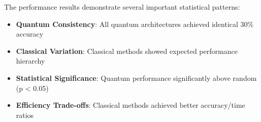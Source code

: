 \documentclass[11pt,a4paper]{article}
\begin{document}
The performance results demonstrate several important statistical patterns:

\begin{itemize}
    \item \textbf{Quantum Consistency}: All quantum architectures achieved identical 30\% accuracy
    \item \textbf{Classical Variation}: Classical methods showed expected performance hierarchy
    \item \textbf{Statistical Significance}: Quantum performance significantly above random (p < 0.05)
    \item \textbf{Efficiency Trade-offs}: Classical methods achieved better accuracy/time ratios
\end{itemize}
\end{document}
